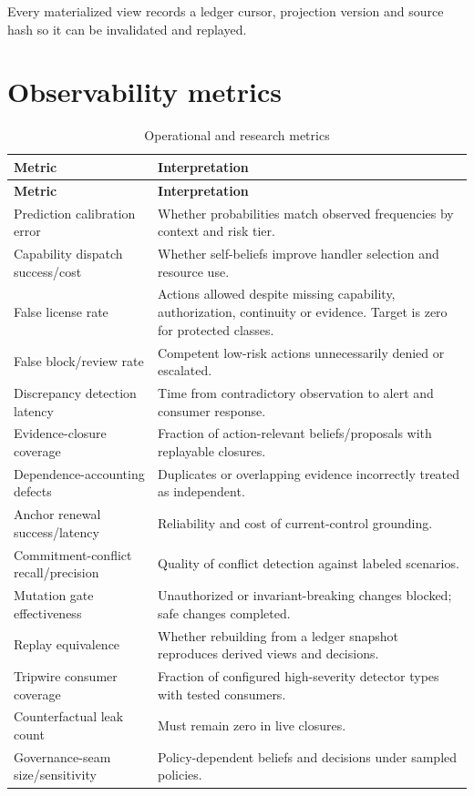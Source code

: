 \documentclass[11pt,oneside]{report}
\begin{document}
Every materialized view records a ledger cursor, projection version and source hash so it can be invalidated and replayed.

\section{Observability metrics}

\begin{longtable}{@{}L{1.90in}L{4.65in}@{}}
\caption{Operational and research metrics}\label{tab:metrics}\\
\toprule
\textbf{Metric} & \textbf{Interpretation} \\
\midrule
\endfirsthead
\toprule
\textbf{Metric} & \textbf{Interpretation} \\
\midrule
\endhead
Prediction calibration error & Whether probabilities match observed frequencies by context and risk tier. \\
Capability dispatch success/cost & Whether self-beliefs improve handler selection and resource use. \\
False license rate & Actions allowed despite missing capability, authorization, continuity or evidence. Target is zero for protected classes. \\
False block/review rate & Competent low-risk actions unnecessarily denied or escalated. \\
Discrepancy detection latency & Time from contradictory observation to alert and consumer response. \\
Evidence-closure coverage & Fraction of action-relevant beliefs/proposals with replayable closures. \\
Dependence-accounting defects & Duplicates or overlapping evidence incorrectly treated as independent. \\
Anchor renewal success/latency & Reliability and cost of current-control grounding. \\
Commitment-conflict recall/precision & Quality of conflict detection against labeled scenarios. \\
Mutation gate effectiveness & Unauthorized or invariant-breaking changes blocked; safe changes completed. \\
Replay equivalence & Whether rebuilding from a ledger snapshot reproduces derived views and decisions. \\
Tripwire consumer coverage & Fraction of configured high-severity detector types with tested consumers. \\
Counterfactual leak count & Must remain zero in live closures. \\
Governance-seam size/sensitivity & Policy-dependent beliefs and decisions under sampled policies. \\
\bottomrule
\end{longtable}
\end{document}
